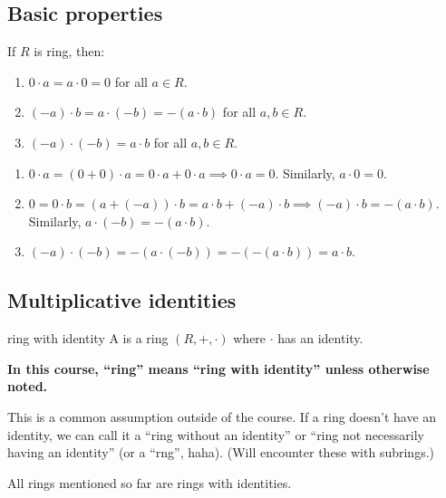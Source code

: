 \documentclass[12pt,letterpaper]{report}
\begin{document}
\pagebreak
\subsection{Basic properties}

\begin{prop}{}{}
  If $R$ is ring, then:
  \begin{enumerate}
    \item $0 \cdot a = a \cdot 0 = 0$ for all $a \in R$.
    \item $(-a) \cdot b = a \cdot (-b) = -(a \cdot b)$ for all $a, b \in R$.
    \item $(-a) \cdot (-b) = a \cdot b$ for all $a, b \in R$.
  \end{enumerate}
\end{prop}

\begin{thmproof}
  \begin{enumerate}
    \item $0 \cdot a = (0 + 0) \cdot a = 0 \cdot a + 0 \cdot a \implies 0 \cdot a = 0$.
      Similarly, $a \cdot 0 = 0$.
    \item $0 = 0 \cdot b = (a + (-a)) \cdot b = a \cdot b + (-a) \cdot b \implies (-a) \cdot b
      = -(a \cdot b)$.
      Similarly, $a \cdot (-b) = -(a \cdot b)$.
    \item $(-a) \cdot (-b) = -(a \cdot (-b)) = -(-(a \cdot b)) = a \cdot b$.
  \end{enumerate}
\end{thmproof}

\pagebreak
\subsection{Multiplicative identities}

\begin{defn}{ring with identity}{}
  A  is a ring $(R, +, \cdot)$ where $\cdot$ has an identity.
\end{defn}

\textbf{In this course, ``ring'' means ``ring with identity'' unless otherwise noted.}

This is a common assumption outside of the course.
If a ring doesn't have an identity, we can call it a ``ring without an identity'' or
``ring not necessarily having an identity'' (or a ``rng'', haha).
(Will encounter these with subrings.)

All rings mentioned so far are rings with identities.
\end{document}
